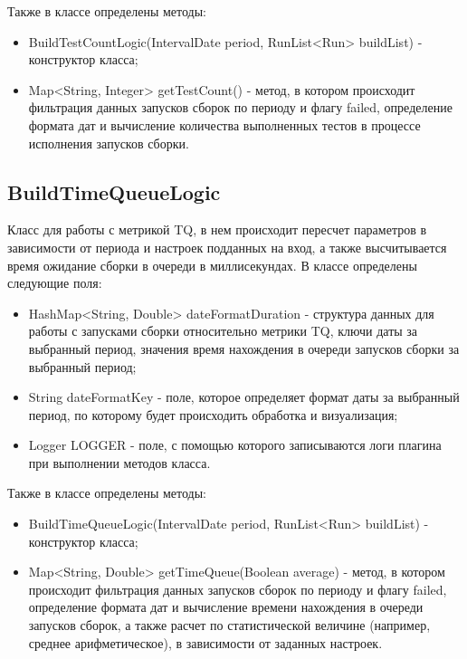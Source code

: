 Также в классе определены методы:

\begin{itemize}
	\item BuildTestCountLogic(IntervalDate period, RunList<Run> buildList) - конструктор класса;
	\item Map<String, Integer> getTestCount() - метод, в котором происходит фильтрация данных запусков сборок по периоду и флагу failed, определение формата дат и вычисление количества выполненных тестов в процессе исполнения запусков сборки.
\end{itemize}

\subsection{BuildTimeQueueLogic}

Класс для работы с метрикой TQ, в нем происходит пересчет параметров в зависимости от периода и настроек подданных на вход, а также высчитывается время ожидание сборки в очереди в миллисекундах. В классе определены следующие поля:

\begin{itemize}
	\item HashMap<String, Double> dateFormatDuration - структура данных для работы с запусками сборки относительно метрики TQ, ключи даты за выбранный период, значения время нахождения в очереди запусков сборки за выбранный период;
	\item String dateFormatKey - поле, которое определяет формат даты за выбранный период, по которому будет происходить обработка и визуализация;
	\item Logger LOGGER - поле, с помощью которого записываются логи плагина при выполнении методов класса.
\end{itemize}

Также в классе определены методы:

\begin{itemize}
	\item BuildTimeQueueLogic(IntervalDate period, RunList<Run> buildList) - конструктор класса;
	\item Map<String, Double> getTimeQueue(Boolean average) - метод, в котором происходит фильтрация данных запусков сборок по периоду и флагу failed, определение формата дат и вычисление времени нахождения в очереди запусков сборок, а также расчет по статистической величине (например, среднее арифметическое), в зависимости от заданных настроек.
\end{itemize}


